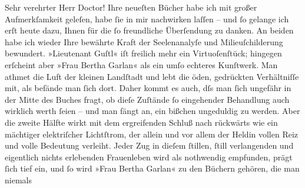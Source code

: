 \pstart{}Sehr verehrter Herr Doctor!\pend\vspace{0.5em}
\pstart
           Ihre neueſten Bücher
               habe ich mit großer Aufmerkſamkeit geleſen, habe ſie in mir nachwirken laſſen – und
               ſo gelange ich erſt heute dazu, Ihnen für die ſo freundliche Überſendung zu danken.
               An beiden habe ich wieder Ihre bewährte Kraft der Seelenanalyſe und Milieuſchilderung
               bewundert. »Lieutenant Guſtl« iſt freilich mehr
               ein Virtuoſenſtück; hingegen erſcheint aber »Frau
                  Bertha Garlan« als ein umſo echteres Kunſtwerk. Man athmet die Luft der
               kleinen Landſtadt und lebt die öden, gedrückten Verhältniſſe mit, als befände man
               ſich dort. Daher kommt es auch, dſs man ſich ungefähr in der Mitte des Buches fragt, ob dieſe Zuſtände
               ſo eingehender Behandlung auch wirklich werth ſeien – und man fängt an, ein bißchen
               ungeduldig zu werden. Aber die zweite Hälfte wirkt mit dem ergreifenden Schluß nach
               rückwärts wie ein mächtiger elektriſcher Lichtſtrom, der allein und vor allem der
               Heldin vollen Reiz und volle Bedeu{\pb}tung verleiht. Jeder Zug in dieſem
               ſtillen, ſtill verlangenden und eigentlich nichts erlebenden Frauenleben wird als
               nothwendig empfunden, prägt ſich tief ein, und ſo wird »Frau Bertha Garlan« zu den Büchern gehören, die man niemals
